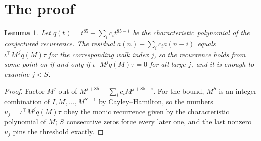 \documentclass[11pt,a4paper]{article}
\theoremstyle{plain}
\newtheorem{lemma}[theorem]{Lemma}
\theoremstyle{definition}
\begin{document}
\section{The proof}

\begin{lemma}\label{lem:crit}
Let $q(t)=t^{85}-\sum_i c_it^{85-i}$ be the characteristic polynomial of the
conjectured recurrence. The residual $a(n)-\sum_ic_ia(n-i)$ equals
$\iota^{\!\top}M^{\,j}q(M)\tau$ for the corresponding walk index $j$, so the recurrence
holds from some point on if and only if $\iota^{\!\top}M^{j}q(M)\tau=0$ for all large $j$,
and it is enough to examine $j<S$.
\end{lemma}

\begin{proof}
Factor $M^{j}$ out of $M^{j+85}-\sum_ic_iM^{j+85-i}$. For the bound, $M^{S}$
is an integer combination of $I,M,\dots,M^{S-1}$ by Cayley--Hamilton, so the numbers
$u_j=\iota^{\!\top}M^{j}q(M)\tau$ obey the monic recurrence given by the characteristic
polynomial of $M$; $S$ consecutive zeros force every later one, and the last nonzero $u_j$
pins the threshold exactly.
\end{proof}
\end{document}
